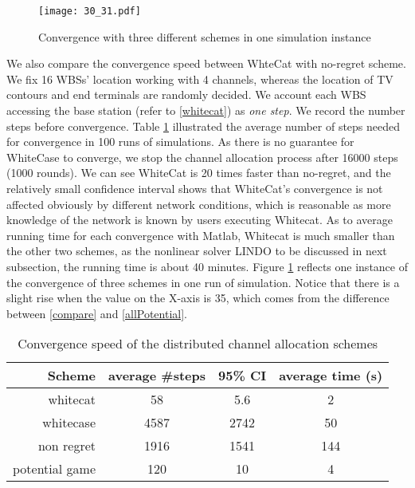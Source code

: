 

\begin{figure}[h!]
  \centering
  \texttt{[image: 30\_31.pdf]}
  \caption{Convergence with three different schemes in one simulation instance}
\label{convergeComp}
\end{figure}


We also compare the convergence speed between WhteCat with no-regret scheme. We fix 16 WBSs' location working with 4 channels, whereas the location of TV contours and end terminals are randomly decided. We account each WBS accessing the base station (refer to \ref{whitecat}) as \textit{one step}. We record the number steps before convergence. Table \ref{convergencespeed} illustrated the average number of steps needed for convergence in 100 runs of simulations. As there is no guarantee for WhiteCase to converge, we stop the channel allocation process after 16000 steps (1000 rounds). We can see WhiteCat is 20 times faster than no-regret, and the relatively small confidence interval shows that WhiteCat's convergence is not affected obviously by different network conditions, which is reasonable as more knowledge of the network is known by users executing Whitecat. As to average running time for each convergence with Matlab, Whitecat is much smaller than the other two schemes, as the nonlinear solver LINDO to be discussed in next subsection, the running time is about 40 minutes. Figure \ref{convergeComp} reflects one instance of the convergence of three schemes in one run of simulation. Notice that there is a slight rise when the value on the X-axis is 35, which comes from the difference between \ref{compare} and \ref{allPotential}.

\begin{table}[!h]
\centering
\begin{tabular}{|r|c|c|c|}
  \hline
  Scheme			 						& average \#steps 	 		& 95\% CI			&average time (s)\\
    \hline
  whitecat									& 58											& 5.6						&2\\\hline
  whitecase 								& 4587 											& 2742						&50\\\hline %
  non regret									& 1916											& 1541						&144\\\hline
  potential game 							& 120							& 10										&4\\
  \hline
\end{tabular}
\caption{Convergence speed of the distributed channel allocation schemes}
\label{convergencespeed}
\end{table}


